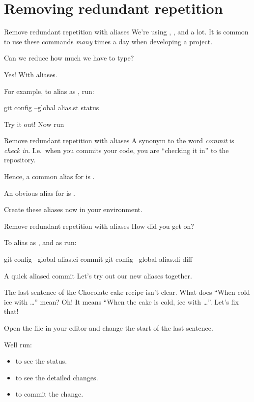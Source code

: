 \documentclass{git_course}
\begin{document}
\section{Removing redundant repetition}

\begin{frame}[fragile]{Remove redundant repetition with aliases}
    We're using , , and  a lot.  It is
    common to use these commands \emph{many} times a day when developing a
    project.

    Can we reduce how much we have to type?

    Yes!  With aliases.

    For example, to alias  as , run:
    \begin{shellcode}
        git config --global alias.st status
    \end{shellcode}

    Try it out!  Now run 
\end{frame}

\begin{frame}[fragile]{Remove redundant repetition with aliases}
    A synonym to the word \emph{commit} is \emph{check in}.  I.e.\ when you
    commits your code, you are ``checking it in'' to the repository.

    Hence, a common alias for  is .

    An obvious alias for  is .

    Create these aliases now in your environment.
\end{frame}

\begin{frame}[fragile]{Remove redundant repetition with aliases}
    How did you get on?

    To alias  as , and  as  run:
    \begin{shellcode}
        git config --global alias.ci commit
        git config --global alias.di diff
    \end{shellcode}
\end{frame}

\begin{frame}[fragile]{A quick aliased commit}
    Let's try out our new aliases together.

    The last sentence of the Chocolate cake recipe isn't clear.  What does
    ``When cold ice with \ldots'' mean?  Oh!  It means ``When the cake is cold,
    ice with \ldots''.  Let's fix that!

    Open the file in your editor and change the start of the last sentence.

    Well run:
    \begin{itemize}
        \item {} to see the status.
        \item {} to see the detailed changes.
        \item {} to commit the change.
    \end{itemize}
\end{frame}
\end{document}
